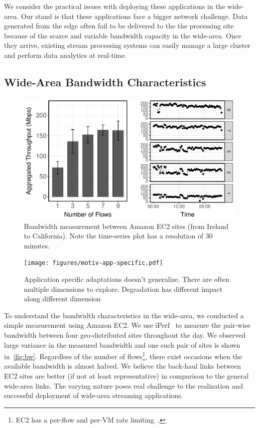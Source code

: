 \vspace{0.5em}

We consider the practical issues with deploying these applications in the
wide-area. Our stand is that these applications face a bigger network challenge.
Data generated from the edge often fail to be delivered to the the processing
site because of the scarce and variable bandwidth capacity in the
wide-area. Once they arrive, existing stream processing systems can easily
manage a large cluster and perform data analytics at real-time.

\subsection{Wide-Area Bandwidth Characteristics}
\label{sec:wide-area-bandwidth}

\begin{figure}
  \centering
  \includegraphics[width=.95\linewidth]{figures/motiv-aws.pdf}
  \caption{Bandwidth measurement between Amazon EC2 sites (from Ireland to
    California). Note the time-series plot has a resolution of 30 minutes.}
  \label{fig:bw}
\end{figure}

\begin{figure}
  \centering
  \texttt{[image: figures/motiv-app-specific.pdf]}
  \caption{Application specific adaptations doesn't generalize. There are often
    multiple dimensions to explore. Degradation has different impact along
    different dimension}
  \label{fig:app-specific}
\end{figure}

To understand the bandwidth characteristics in the wide-area, we conducted a
simple measurement using Amazon EC2. We use iPerf~\cite{iperf3} to measure the
pair-wise bandwidth between four geo-distributed sites throughout the day. We
observed large variance in the measured bandwidth and one such pair of sites is
shown in~\autoref{fig:bw}. Regardless of the number of flows\footnote{EC2 has a
  per-flow and per-VM rate limiting~\cite{zhang2016guaranteeing}.}, there exist
occasions when the available bandwidth is almost halved. We believe the
back-haul links between EC2 sites are better (if not at least representative) in
comparison to the general wide-area links. The varying nature poses real
challenge to the realization and successful deployment of wide-area streaming
applications.

